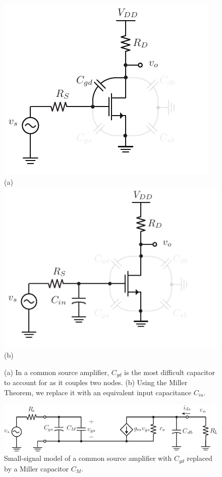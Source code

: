 \begin{figure}[H]
\centering
\includegraphics[scale=1.2]{cs_amp_cgd}\\
(a)\\[0.25cm]
\includegraphics[scale=1.2]{cs_amp_cgd_miller}\\
(b)\\
\caption{(a) In a common source amplifier, $C_{gd}$ is the most difficult capacitor to account for as it couples two nodes.  (b) Using the Miller Theorem, we replace it with an equivalent input capacitance $C_{in}$.}
\label{fig:cs_amp_cgd}
\end{figure}
\begin{figure}[H]
\centering
\includegraphics[scale=1.20]{cs_amp_ac_caps_miller}
\caption{Small-signal model of a common source amplifier with $C_{gd}$ replaced by a Miller capacitor $C_M$.}
\label{fig:cs_amp_ac_caps_miller}
\end{figure}
